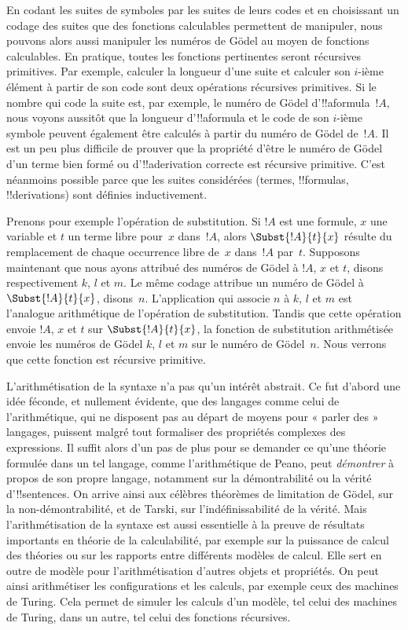 \documentclass[../../../include/open-logic-section]{subfiles}
\begin{document}
En codant les suites de symboles par les suites de leurs codes et
en choisissant un codage des suites que des fonctions calculables
permettent de manipuler, nous pouvons alors aussi manipuler les
numéros de G\"odel au moyen de fonctions calculables. En pratique,
toutes les fonctions pertinentes seront récursives primitives. Par
exemple, calculer la longueur d'une suite et calculer son $i$-ième
élément à partir de son code sont deux opérations récursives
primitives. Si le nombre qui code la suite est, par exemple, le
numéro de G\"odel d'!!a{formula}~$!A$, nous voyons aussitôt que la
longueur d'!!a{formula} et le code de son $i$-ième symbole peuvent
également être calculés à partir du numéro de G\"odel de~$!A$. Il
est un peu plus difficile de prouver que la propriété d'être le
numéro de G\"odel d'un terme bien formé ou d'!!a{derivation}
correcte est récursive primitive. C'est néanmoins possible parce
que les suites considérées (termes, !!{formula}s, !!{derivation}s)
sont définies inductivement.

Prenons pour exemple l'opération de substitution. Si $!A$ est une
formule, $x$ une variable et $t$ un terme libre pour~$x$ dans~$!A$, alors $\Subst{!A}{t}{x}$
résulte du remplacement de chaque occurrence libre de~$x$ dans~$!A$
par~$t$. Supposons maintenant que nous ayons attribué des numéros de
G\"odel à $!A$, $x$ et $t$, disons respectivement $k$, $l$ et $m$.
Le même codage attribue un numéro de G\"odel à $\Subst{!A}{t}{x}$,
disons~$n$. L'application qui associe $n$ à $k$, $l$ et $m$ est
l'analogue arithmétique de l'opération de substitution. Tandis que
cette opération envoie $!A$, $x$ et $t$ sur $\Subst{!A}{t}{x}$,
la fonction de substitution arithmétisée envoie les numéros de
G\"odel $k$, $l$ et $m$ sur le numéro de G\"odel~$n$. Nous
verrons que cette fonction est récursive primitive.

L'arithmétisation de la syntaxe n'a pas qu'un intérêt abstrait. Ce
fut d'abord une idée féconde, et nullement évidente, que des
langages comme celui de l'arithmétique, qui ne disposent pas au
départ de moyens pour « parler des » langages, puissent malgré tout
formaliser des propriétés complexes des expressions. Il suffit
alors d'un pas de plus pour se demander ce qu'une théorie formulée
dans un tel langage, comme l'arithmétique de Peano, peut
\emph{démontrer} à propos de son propre langage, notamment sur la
démontrabilité ou la vérité d'!!{sentence}s. On arrive ainsi aux
célèbres théorèmes de limitation de G\"odel, sur la
non-démontrabilité, et de Tarski, sur l'indéfinissabilité de la
vérité. Mais l'arithmétisation de la syntaxe est aussi essentielle
à la preuve de résultats importants en théorie de la calculabilité,
par exemple sur la puissance de calcul des théories ou sur les
rapports entre différents modèles de calcul. Elle sert en outre de
modèle pour l'arithmétisation d'autres objets et propriétés. On
peut ainsi arithmétiser les configurations et les calculs, par
exemple ceux des machines de Turing. Cela permet de simuler les
calculs d'un modèle, tel celui des machines de Turing, dans un autre,
tel celui des fonctions récursives.
\end{document}
